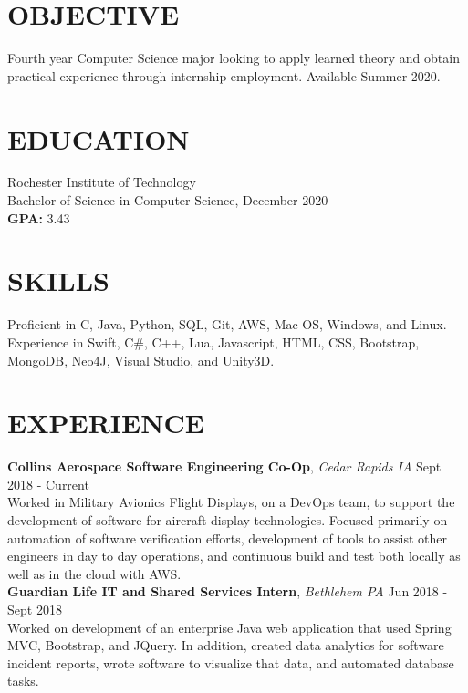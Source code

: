 \documentclass[line, margin]{res}
\begin{document}
\address{(484) 554-8487\\ emp9173@rit.edu}

\begin{resume}
\vspace{-7.5mm} %

\section{OBJECTIVE}
Fourth year Computer Science major looking to apply learned theory and obtain practical experience through internship employment. Available Summer 2020.

\section{EDUCATION} 
 Rochester Institute of Technology \\
 Bachelor of Science in Computer Science, December 2020\\
 \textbf{GPA:} 3.43
 
\section{SKILLS}
Proficient in C, Java, Python, SQL, Git, AWS, Mac OS, Windows, and Linux. \\
Experience in Swift, C\#, C++, Lua, Javascript, HTML, CSS, Bootstrap, MongoDB, Neo4J, Visual Studio, and Unity3D.
 
 
\section{EXPERIENCE} 
\textbf{Collins Aerospace Software Engineering Co-Op}, \textit{Cedar Rapids IA} \hfill Sept 2018 - Current \\
Worked in Military Avionics Flight Displays, on a DevOps team, to support the development of software for aircraft display technologies.  Focused primarily on automation of software verification efforts, development of tools to assist other engineers in day to day operations, and continuous build and test both locally as well as in the cloud with AWS. \\ [10pt]
\textbf{Guardian Life IT and Shared Services Intern}, \textit{Bethlehem PA} \hfill Jun 2018 - Sept 2018 \\
Worked on development of an enterprise Java web application that used Spring MVC, Bootstrap, and JQuery.  In addition, created
data analytics for software incident reports, wrote software to visualize that data, and automated database tasks. \\
\vspace{-5.5mm}



\end{resume}
\end{document}
